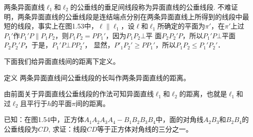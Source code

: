   两条异面直线$\ell_1$和$\ell_2$的公垂线的垂足间线段称为异面直线的公垂线段. 不难证明，两条异面直线的公垂线段是连结端点分别在两条异面直线上所得到的线段中最短的线段，事实上在图1.53中，$\ell\parallel \ell_1$，设$\ell$和$\ell_1$所确定的平面为$\pi'$，在$\pi'$上过$P_1'$作$P_1'P\parallel P_1P_2$，则$P_1P_2=PP_1'$，因为$P_1P_2\bot $平
  面$P_2P_2'P$，所以$P_1'P\bot $平面$P_2P_2'P$，于是，$P_1'P\bot PP_2'$，
  显然，$P'_1P_2'\ge PP_1'$，所以$P_1P_2\le P_1'P_2'$．
  
    
  

下面我们给异面直线间的距离下定义。

\begin{blk}
  {定义} 两条异面直线间公垂线段的长叫作两条异面直线的距离。
\end{blk}


由前面关于异面直线公垂线段的作法可知异面直线$\ell_1$和$\ell_2$的距离，也就是$\ell_1$和过$\ell_2$且平行于$h$的平面$\pi$间的距离。

\begin{example}
  已知：在图1.54中，正方体$A_1A_2A_3A_4-B_1B_2B_3B_4$中，面的对角线$A_2B_3$和$B_2B_4$的公垂线段为$CD$, 求证：线段$CD$等于正方体对角线的三分之一。
\end{example}

\begin{figure}[htp]
  \centering
{}
  \caption{}
\end{figure}

